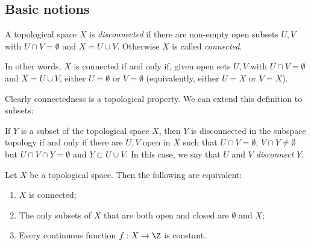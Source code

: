 \setcounter{lecture}{3}

\subsection{Basic notions} %
\label{sub:basic_notions}

\begin{definition}
	A topological space $X$ is \emph{disconnected} if there are non-empty open subsets $U, V$ with $U\cap V = \emptyset$ and $X=U\cup V$. Otherwise $X$ is called \emph{connected}.

	In other words, $X$ is connected if and only if, given open sets $U,V$ with $U \cap V = \emptyset$ and $X=U\cup V$, either $U=\emptyset$ or $V=\emptyset$ (equivalently, either $U=X$ or $V=X$).
\end{definition}

Clearly connectedness is a topological property. We can extend this definition to subsets:

\begin{definition}
	If $Y$ is a subset of the topological space $X$, then $Y$ is disconnected in the subspace topology if and only if there are $U, V$ open in $X$ such that $U\cap V=\emptyset$, $V\cap Y\neq \emptyset$ but $U\cap V\cap Y=\emptyset$ and $Y\subset U\cup V$. In this case, we say that $U$ and $V$ \emph{disconnect} $Y$.
\end{definition}

\begin{proposition}
	Let $X$ be a topological space. Then the following are equivalent: \label{prop:equivalent-properties}
	\begin{enumerate}
		\shortskip
		\item $X$ is connected;
		\item The only subsets of $X$ that are both open and closed are $\emptyset$ and $X$;
		\item Every continuous function $f:X\to\Z$ is constant.
	\end{enumerate}
\end{proposition}

